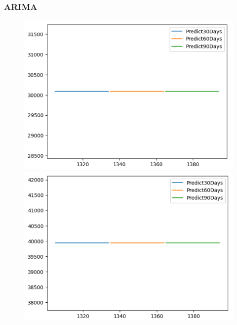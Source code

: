 \subsubsection{ARIMA}
\begin{figure}[H]
    \centering
    \begin{minipage}{0.15\textwidth}
    \centering
    \includegraphics[width=1\textwidth]{resources/chapter-5/newdata1/predicted/BIDV_ARIMA_7-3_30days.png}
    \end{minipage}
    \hfill
    \begin{minipage}{0.15\textwidth}
    \centering
    \includegraphics[width=1\textwidth]{resources/chapter-5/newdata1/predicted/BIDV_ARIMA_8-2_30days.png}
    \end{minipage}
    \hfill
        \begin{minipage}{0.15\textwidth}

\end{minipage}
\end{figure}
